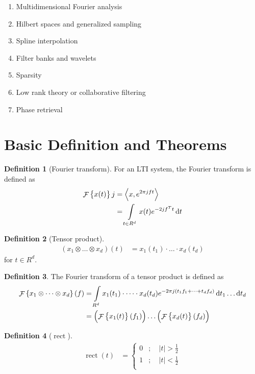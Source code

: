 \documentclass[titlepage, fleqn, a4paper, 12pt, twoside]{article}
\theoremstyle{definition}
\newtheorem{definition}{Definition}
\theoremstyle{theorem}
\DeclareMathOperator{\FT}{\mathcal{F}}
\DeclareMathOperator{\rect}{\mathrm{rect}}
\begin{document}
\begin{enumerate}
	\item Multidimensional Fourier analysis
	\item Hilbert spaces and generalized sampling
	\item Spline interpolation
	\item Filter banks and wavelets
	\item Sparsity
	\item Low rank theory or collaborative filtering
	\item Phase retrieval
\end{enumerate}

\clearpage
{}

\part{Basic Definition and Theorems}

\begin{definition}[Fourier transform]
	For an LTI system, the Fourier transform is defined as
	\begin{align*}
		\FT\left\{ x(t) \right\}j &= \left\langle x,e^{2 \pi j f t} \right\rangle\\
		&= \int\limits_{t \in R^d} x(t) e^{-2 j f^T t} \dif t
	\end{align*}
	\label{def:Fourier_transform}
\end{definition}

\begin{definition}[Tensor product]
	\begin{align*}
		(x_1 \otimes \dots \otimes x_d)(t) &= x_1(t_1) \cdot \dots \cdot x_d(t_d)
	\end{align*}
	for $t \in R^d$.
\end{definition}

\begin{definition}
	The Fourier transform of a tensor product is defined as
	\begin{align*}
		\FT\left\{ x_1 \otimes \dots \otimes x_d \right\}(f) &= \int\limits_{R^d} x_1(t_1) \cdot \dots \cdot x_d(t_d) e^{-2 \pi j (t_1 f_1 + \dots + t_d f_d)} \dif t_1 \dots \dif t_d\\
		&= \left( \FT\left\{ x_1(t) \right\}(f_1) \right) \dots \left( \FT\left\{ x_d(t) \right\}(f_d) \right)
	\end{align*}
\end{definition}

\begin{definition}[$\rect$]
	\begin{align*}
		\rect(t) &=
			\begin{cases}
				0 &;\quad |t| > \frac{1}{2}\\
				1 &;\quad |t| < \frac{1}{2}\\
			\end{cases}
	\end{align*}
\end{definition}
\end{document}
